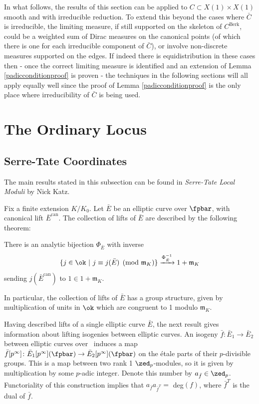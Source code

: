 \documentclass[12pt,letterpaper]{article}
\DeclareMathOperator{\can}{can}
\begin{document}
	
	In what follows, the results of this section can be applied to $C\subset X(1)\times X(1)$ smooth and with irreducible reduction. To extend this beyond the cases where $\bar{C}$ is irreducible, the limiting measure, if still supported on the skeleton of $C^\text{Berk}$, could be a weighted sum of Dirac measures on the canonical points (of which there is one for each irreducible component of $\bar{C}$), or involve non-discrete measures supported on the edges. If indeed there is equidistribution in these cases then - once the correct limiting measure is identified and an extension of Lemma \ref{padicconditionproof} is proven - the techniques in the following sections will all apply equally well since the proof of Lemma \ref{padicconditionproof} is the only place where irreducibility of $\bar{C}$ is being used.

	
	
	
	
	\section{The Ordinary Locus} \label{SecOrd}
	
	\subsection{Serre-Tate Coordinates}\label{ST}
	
	The main results stated in this subsection can be found in \textit{Serre-Tate Local Moduli} by Nick Katz.
	
	Fix a finite extension $K/K_0$. Let $\bar{E}$ be an elliptic curve over $\fpbar$, with canonical lift ${\bar{E}}^{\text{can}}$. The collection of lifts of $\bar{E}$ are described by the following theorem:
	
	\begin{thm}
		There is an analytic bijection $\Phi_{\bar{E}}$ with inverse
		\[\{j\in \ok \ | \ j\equiv j(\bar{E})\pmod{\mathfrak{m}_K} \}\xrightarrow{\Phi_{\bar{E}}^{-1}} 1+\mathfrak{m}_K\]
		sending $j({\bar{E}}^{\can})$ to $1\in 1+\mathfrak{m}_K$.
	\end{thm}
	
	In particular, the collection of lifts of $\bar{E}$ has a group structure, given by multiplication of units in $\ok$ which are congruent to 1 modulo $\mathfrak{m}_K$.
	
	Having described lifts of a single elliptic curve ${\bar{E}}$, the next result gives information about lifting isogenies between elliptic curves. An isogeny $\bar{f}\colon\bar{E}_1\to \bar{E}_2$ between elliptic curves over \fpbar\ induces a map $\bar{f}[p^\infty]\colon\bar{E}_1[p^\infty](\fpbar) \to\bar{E}_2 [p^\infty](\fpbar)$ on the \'etale parts of their $p$-divisible groups. This is a map between two rank 1 $\zed_p$-modules, so it is given by multiplication by some $p$-adic integer. Denote this number by $a_{\bar{f}}\in \zed_p$. Functoriality of this construction implies that $a_{\bar{f}} a_{\bar{f}^T} =$ deg$(f)$, where $\bar{f}^T$ is the dual of $\bar{f}$. 
	
\end{document}
